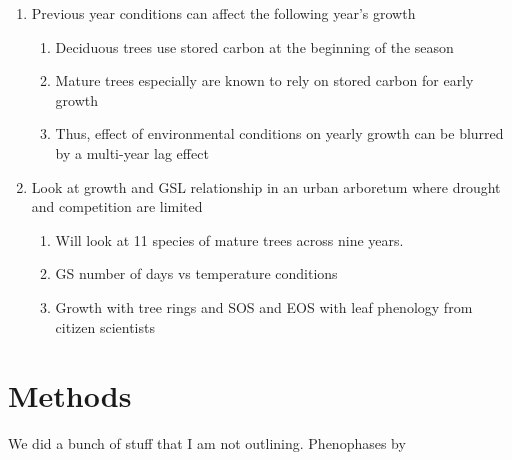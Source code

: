 \documentclass{article}\usepackage[]{graphicx}\usepackage[]{xcolor}
\begin{document}
\begin{enumerate}
\begin{enumerate}
  \item Different carbon allocation strategies may mute short term growth responses: storage investment vs opportunistic growth
  
  \item Increased C storage in current year, but stored instead of invested in growth: importance of considering multiple years
  
  \end{enumerate}
  
\item Previous year conditions can affect the following year's growth
  \begin{enumerate}
  \item Deciduous trees use stored carbon at the beginning of the season
  
  \item Mature trees especially are known to rely on stored carbon for early growth 
  
  \item Thus, effect of environmental conditions on yearly growth can be blurred by a multi-year lag effect %
  
  \end{enumerate}
  
\item Look at growth and GSL relationship in an urban arboretum where drought and competition are limited
  \begin{enumerate}
  \item Will look at 11 species of mature trees across nine years. 
  
  \item GS number of days vs temperature conditions
  
  \item Growth with tree rings and SOS and EOS with leaf phenology from citizen scientists 
  
  \end{enumerate}
\end{enumerate}

\section*{Methods}
We did a bunch of stuff that I am not outlining. Phenophases by \citep{denny_standardized_2014}
\end{document}
